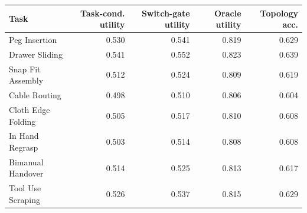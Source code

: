 \begin{tabular}{lrrrr}
\toprule
Task & Task-cond. utility & Switch-gate utility & Oracle utility & Topology acc. \\
\midrule
Peg Insertion & 0.530 & 0.541 & 0.819 & 0.629 \\
Drawer Sliding & 0.541 & 0.552 & 0.823 & 0.639 \\
Snap Fit Assembly & 0.512 & 0.524 & 0.809 & 0.619 \\
Cable Routing & 0.498 & 0.510 & 0.806 & 0.604 \\
Cloth Edge Folding & 0.505 & 0.517 & 0.810 & 0.608 \\
In Hand Regrasp & 0.503 & 0.514 & 0.808 & 0.608 \\
Bimanual Handover & 0.514 & 0.525 & 0.813 & 0.617 \\
Tool Use Scraping & 0.526 & 0.537 & 0.815 & 0.629 \\
\bottomrule
\end{tabular}
